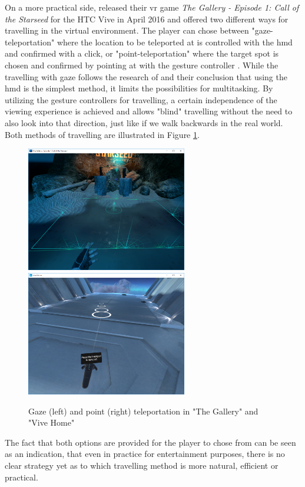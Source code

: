On a more practical side, \cite{CloudheadGames2016} released their \gls{vr} game \textit{The Gallery - Episode 1: Call of the Starseed} for the HTC Vive in April 2016 and offered two different ways for travelling in the virtual environment. The player can chose between "gaze-teleportation" where the location to be teleported at is controlled with the \gls{hmd} and confirmed with a click, or "point-teleportation" where the target spot is chosen and confirmed by pointing at with the gesture controller \citep{CloudheadGames2016}. While the travelling with gaze follows the research of \cite{Jamieson2007} and their conclusion that using the \gls{hmd} is the simplest method, it limits the possibilities for multitasking. By utilizing the gesture controllers for travelling, a certain independence of the viewing experience is achieved and allows "blind" travelling without the need to also look into that direction, just like if we walk backwards in the real world. Both methods of travelling are illustrated in Figure \ref{fig:gazePointTeleportation}.
\begin{figure}[h]
	\begin{center}
		\includegraphics[width=7cm]{03_Figures/05_LitReview/Cloudhead2016_TheGallery2.png}
		\includegraphics[width=7cm]{03_Figures/05_LitReview/HTCVive2016_ViveHome.png}
		\caption[Gaze and point teleportation in "The Gallery" and "Vive Home"]{Gaze (left) and point (right) teleportation in "The Gallery"  \citep{CloudheadGames2016} and "Vive Home" \citep{Htcvive2016a}}
		\label{fig:gazePointTeleportation}
	\end{center}
\end{figure} \newline
The fact that both options are provided for the player to chose from can be seen as an indication, that even in practice for entertainment purposes, there is no clear strategy yet as to which travelling method is more natural, efficient or practical.

